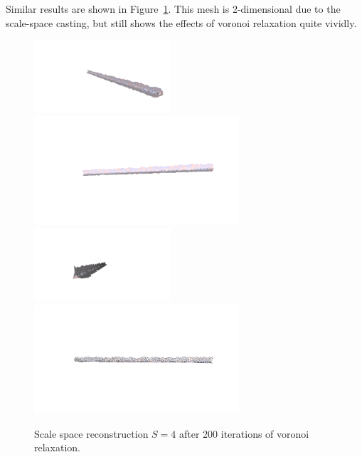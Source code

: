 \documentclass[12pt]{drexelthesis}
\begin{document}
Similar results are shown in Figure~\ref{zeronoise:scalespace4lloyd}. This mesh is 2-dimensional due to the scale-space casting, but still shows the effects of voronoi relaxation quite vividly.

\begin{figure}[!ht]
	\centering
		\includegraphics[trim={6in 2in 2in 3in},clip,width=2in]{simulated-lab-scan/0noise/optimized/scalespace4Lloyd30s200it00.png}
		\includegraphics[trim={3.5in 2in 2.5in 2in}, clip, width=3in]{simulated-lab-scan/0noise/optimized/scalespace4Lloyd30s200it01.png}
		\includegraphics[trim={4.5in 2in 4.5in 3in},clip,width=2in]{simulated-lab-scan/0noise/optimized/scalespace4Lloyd30s200it02.png}
		\includegraphics[trim={3in 4in 3.5in 4in},clip,width=3in]{simulated-lab-scan/0noise/optimized/scalespace4Lloyd30s200it03.png}
		\caption[Scale space reconstruction $S = 4$ after 200 iterations of voronoi relaxation]{\centering Scale space reconstruction $S = 4$ after 200 iterations of voronoi relaxation.}
	\label{zeronoise:scalespace4lloyd}
\end{figure}
\end{document}
